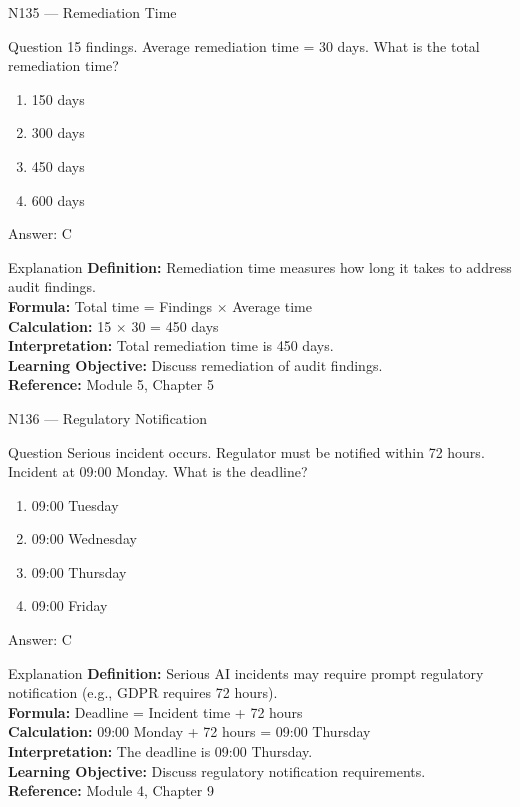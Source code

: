 \documentclass[aspectratio=169,8pt]{beamer}
\begin{document}
	\begin{frame}{N135 --- Remediation Time}
		\begin{block}{Question}
			15 findings. Average remediation time = 30 days. What is the total remediation time?
			\begin{enumerate}
				\item 150 days
				\item 300 days
				\item 450 days
				\item 600 days
			\end{enumerate}
		\end{block}
		\begin{exampleblock}{Answer: C}\end{exampleblock}
		\begin{block}{Explanation}
			\textbf{Definition:} Remediation time measures how long it takes to address audit findings.\\
			\textbf{Formula:} Total time = Findings $\times$ Average time\\
			\textbf{Calculation:} 15 $\times$ 30 = 450 days\\
			\textbf{Interpretation:} Total remediation time is 450 days.\\
			\textbf{Learning Objective:} Discuss remediation of audit findings.\\
			\textbf{Reference:} Module 5, Chapter 5
		\end{block}
	\end{frame}
	
	\begin{frame}{N136 --- Regulatory Notification}
		\begin{block}{Question}
			Serious incident occurs. Regulator must be notified within 72 hours. Incident at 09:00 Monday. What is the deadline?
			\begin{enumerate}
				\item 09:00 Tuesday
				\item 09:00 Wednesday
				\item 09:00 Thursday
				\item 09:00 Friday
			\end{enumerate}
		\end{block}
		\begin{exampleblock}{Answer: C}\end{exampleblock}
		\begin{block}{Explanation}
			\textbf{Definition:} Serious AI incidents may require prompt regulatory notification (e.g., GDPR requires 72 hours).\\
			\textbf{Formula:} Deadline = Incident time + 72 hours\\
			\textbf{Calculation:} 09:00 Monday + 72 hours = 09:00 Thursday\\
			\textbf{Interpretation:} The deadline is 09:00 Thursday.\\
			\textbf{Learning Objective:} Discuss regulatory notification requirements.\\
			\textbf{Reference:} Module 4, Chapter 9
		\end{block}
	\end{frame}
	
\end{document}
